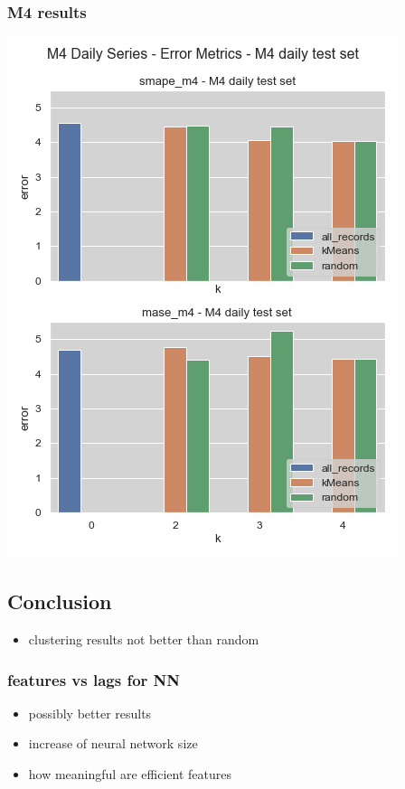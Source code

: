 \documentclass[11pt]{article}
\begin{document}
\subsubsection*{M4 results}
\label{sec:orgce1f6c8}
\begin{center}
\includegraphics[width=.9\linewidth]{../img/daily_m4_results.png}
\end{center}
\subsection*{Conclusion}
\label{sec:org84c404d}
\begin{itemize}
\item clustering results not better than random
\end{itemize}
\subsubsection*{features vs lags for NN}
\label{sec:org965bd88}
\begin{itemize}
\item possibly better results
\item increase of neural network size
\item how meaningful are efficient features
\end{itemize}
\end{document}
